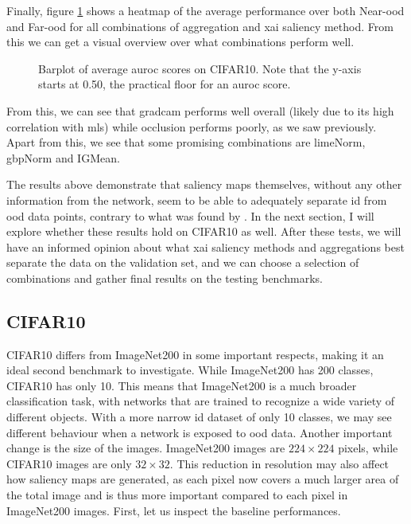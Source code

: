 \documentclass[UKenglish]{uiomasterthesis} %
\theoremstyle{definition}
\begin{document}
Finally, figure \ref{fig:imagenet200_heatmap} shows a heatmap of the average performance over both Near-\ac{ood} and Far-\ac{ood} for all combinations of aggregation and \ac{xai} saliency method. From this we can get a visual overview over what combinations perform well.

\begin{figure}[H]
    \begin{center}
        
    \end{center}
    \caption[Average scores]{Barplot of average \ac{auroc} scores on CIFAR10. Note that the y-axis starts at 0.50, the practical floor for an \ac{auroc} score.}
    \label{fig:imagenet200_heatmap}
\end{figure}

From this, we can see that \ac{gradcam} performs well overall (likely due to its high correlation with \ac{mls}) while occlusion performs poorly, as we saw previously. Apart from this, we see that some promising combinations are \ac{lime}Norm, \ac{gbp}Norm and IGMean.



The results above demonstrate that saliency maps themselves, without any other information from the network, seem to be able to adequately separate \ac{id} from \ac{ood} data points, contrary to what was found by \cite{martinez}. In the next section, I will explore whether these results hold on CIFAR10 as well. After these tests, we will have an informed opinion about what \ac{xai} saliency methods and aggregations best separate the data on the validation set, and we can choose a selection of combinations and gather final results on the testing benchmarks.

\subsection{CIFAR10}

CIFAR10 differs from ImageNet200 in some important respects, making it an ideal second benchmark to investigate. While ImageNet200 has 200 classes, CIFAR10 has only 10. This means that ImageNet200 is a much broader classification task, with networks that are trained to recognize a wide variety of different objects. With a more narrow \ac{id} dataset of only 10 classes, we may see different behaviour when a network is exposed to \ac{ood} data. Another important change is the size of the images. ImageNet200 images are $224 \times 224$ pixels, while CIFAR10 images are only $32 \times 32$. This reduction in resolution may also affect how saliency maps are generated, as each pixel now covers a much larger area of the total image and is thus more important compared to each pixel in ImageNet200 images. First, let us inspect the baseline performances.
\end{document}

